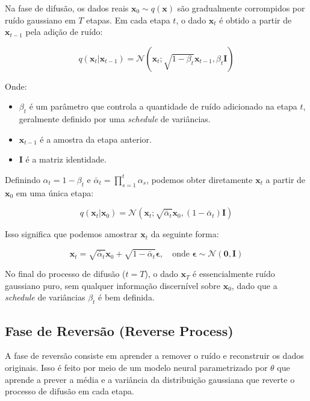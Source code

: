 \documentclass{tufte-handout}
\begin{document}
Na fase de difusão, os dados reais $\mathbf{x}_0 \sim q(\mathbf{x})$ são gradualmente corrompidos por ruído gaussiano em $T$ etapas. Em cada etapa $t$, o dado $\mathbf{x}_t$ é obtido a partir de $\mathbf{x}_{t-1}$ pela adição de ruído:

\begin{equation}
    q(\mathbf{x}_t | \mathbf{x}_{t-1}) = \mathcal{N}(\mathbf{x}_t; \sqrt{1 - \beta_t} \mathbf{x}_{t-1}, \beta_t \mathbf{I})
\end{equation}

Onde:
\begin{itemize}
    \item $\beta_t$ é um parâmetro que controla a quantidade de ruído adicionado na etapa $t$, geralmente definido por uma \textit{schedule} de variâncias.
    \item $\mathbf{x}_{t-1}$ é a amostra da etapa anterior.
    \item $\mathbf{I}$ é a matriz identidade.
\end{itemize}

Definindo $\alpha_t = 1 - \beta_t$ e $\bar{\alpha}_t = \prod_{s=1}^t \alpha_s$, podemos obter diretamente $\mathbf{x}_t$ a partir de $\mathbf{x}_0$ em uma única etapa:

\begin{equation}
    q(\mathbf{x}_t | \mathbf{x}_0) = \mathcal{N}(\mathbf{x}_t; \sqrt{\bar{\alpha}_t} \mathbf{x}_0, (1 - \bar{\alpha}_t) \mathbf{I})
\end{equation}

Isso significa que podemos amostrar $\mathbf{x}_t$ da seguinte forma:

\begin{equation}
    \mathbf{x}_t = \sqrt{\bar{\alpha}_t} \mathbf{x}_0 + \sqrt{1 - \bar{\alpha}_t} \boldsymbol{\epsilon}, \quad \text{onde } \boldsymbol{\epsilon} \sim \mathcal{N}(\mathbf{0}, \mathbf{I})
\end{equation}

No final do processo de difusão ($t = T$), o dado $\mathbf{x}_T$ é essencialmente ruído gaussiano puro, sem qualquer informação discernível sobre $\mathbf{x}_0$, dado que a \textit{schedule} de variâncias $\beta_t$ é bem definida.

\subsection{Fase de Reversão (Reverse Process)}

A fase de reversão consiste em aprender a remover o ruído e reconstruir os dados originais. Isso é feito por meio de um modelo neural parametrizado por $\theta$ que aprende a prever a média e a variância da distribuição gaussiana que reverte o processo de difusão em cada etapa.
\end{document}
